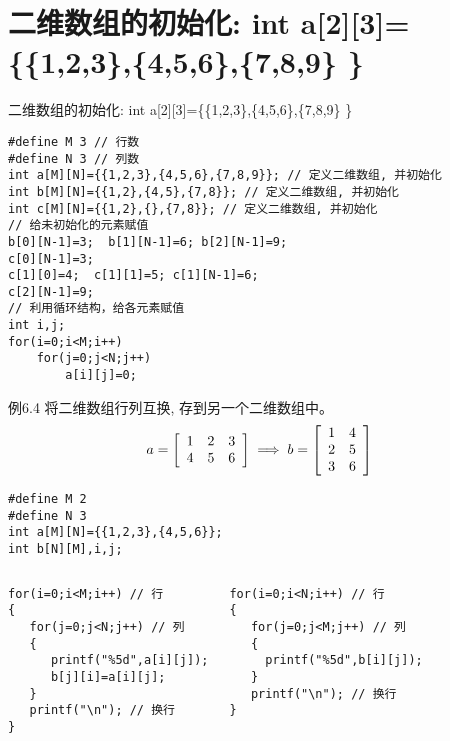 \section{二维数组的初始化: int a[2][3]=\{\{1,2,3\},\{4,5,6\},\{7,8,9\} \}}

\begin{frame}{二维数组的初始化: int a[2][3]=\{\{1,2,3\},\{4,5,6\},\{7,8,9\} \}}
\begin{lstlisting}
#define M 3 // 行数
#define N 3 // 列数
int a[M][N]={{1,2,3},{4,5,6},{7,8,9}}; // 定义二维数组, 并初始化
int b[M][N]={{1,2},{4,5},{7,8}}; // 定义二维数组, 并初始化
int c[M][N]={{1,2},{},{7,8}}; // 定义二维数组, 并初始化
// 给未初始化的元素赋值
b[0][N-1]=3;  b[1][N-1]=6; b[2][N-1]=9;
c[0][N-1]=3; 
c[1][0]=4;  c[1][1]=5; c[1][N-1]=6; 
c[2][N-1]=9;
// 利用循环结构，给各元素赋值
int i,j;
for(i=0;i<M;i++)
	for(j=0;j<N;j++)
		a[i][j]=0;
\end{lstlisting}
\end{frame}

\begin{frame}{例6.4 将二维数组行列互换, 存到另一个二维数组中。}
\vspace{-0.4cm}
\small
\[
a=\left[
\begin{array}[c]{ccc}
1 & 2 & 3\\
4 & 5 & 6
\end{array}
\right]
\implies
b=\left[
\begin{array}[c]{cc}
1 & 4\\
2 & 5\\
3 & 6
\end{array}
\right]
\]
\pause
\vspace{-0.5cm}
\begin{lstlisting}
#define M 2 
#define N 3 
int a[M][N]={{1,2,3},{4,5,6}};
int b[N][M],i,j;
\end{lstlisting}
\vspace{-0.4cm}
\begin{columns}[T]
\pause
\begin{lstlisting}
for(i=0;i<M;i++) // 行
{
   for(j=0;j<N;j++) // 列
   {
      printf("%5d",a[i][j]);
      b[j][i]=a[i][j]; 
   }
   printf("\n"); // 换行
}
\end{lstlisting}
\pause
\begin{lstlisting}[frame=leftline]
for(i=0;i<N;i++) // 行
{
   for(j=0;j<M;j++) // 列
   {
     printf("%5d",b[i][j]); 
   }
   printf("\n"); // 换行
}
\end{lstlisting}
\end{columns}
\vspace{0.001cm}
\end{frame}

